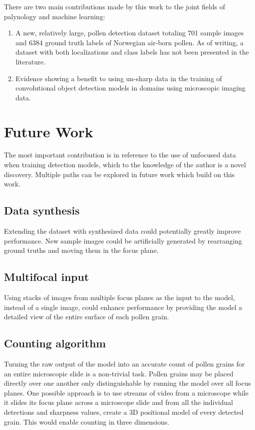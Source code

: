 There are two main contributions made by this work to the joint fields of palynology and machine learning:

\begin{enumerate}
    \item A new, relatively large, pollen detection dataset totaling 701 sample images and 6384 ground truth labels of Norwegian air-born pollen. As of writing, a dataset with both localizations and class labels has not been presented in the literature.
    \item Evidence showing a benefit to using un-sharp data in the training of convolutional object detection models in domains using microscopic imaging data.
\end{enumerate}

\section{Future Work}
The most important contribution is in reference to the use of unfocused data when training detection models, which to the knowledge of the author is a novel discovery.
Multiple paths can be explored in future work which build on this work.

\subsection*{Data synthesis}
Extending the dataset with synthesized data could potentially greatly improve performance.
New sample images could be artificially generated by rearranging ground truths and moving them in the focus plane.

\subsection*{Multifocal input}
Using stacks of images from multiple focus planes as the input to the model, instead of a single image, could enhance performance by providing the model a detailed view of the entire surface of each pollen grain.

\subsection*{Counting algorithm}
Turning the raw output of the model into an accurate count of pollen grains for an entire microscopic slide is a non-trivial task.
Pollen grains may be placed directly over one another only distinguishable by running the model over all focus planes.
One possible approach is to use streams of video from a microscope while it slides its focus plane across a microscope slide and from all the individual detections and sharpness values, create a 3D positional model of every detected grain.
This would enable counting in three dimensions.

